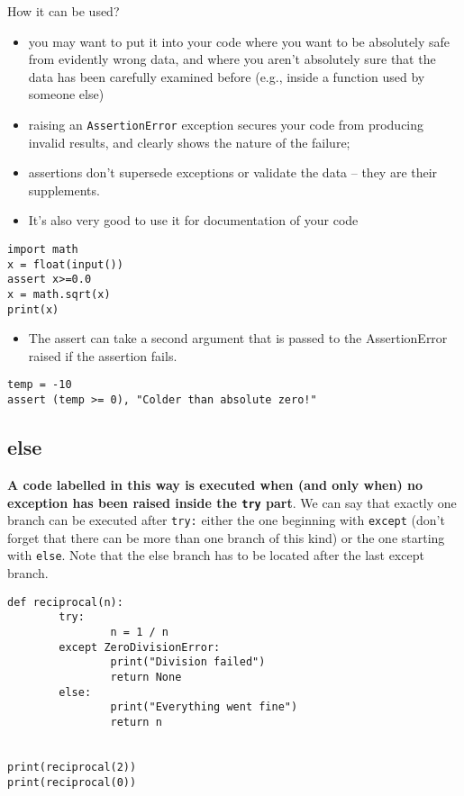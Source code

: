 \documentclass[11pt]{article}
\begin{document}
How it can be used?
\begin{itemize}
\item you may want to put it into your code where you want to be
absolutely safe from evidently wrong data, and where you aren’t
absolutely sure that the data has been carefully examined before
(e.g., inside a function used by someone else)
\item raising an \texttt{AssertionError} exception secures your code from producing
invalid results, and clearly shows the nature of the failure;
\item assertions don’t supersede exceptions or validate the data – they
are their supplements.
\item It's also very good to use it for documentation of your code
\end{itemize}

\begin{verbatim}
import math
x = float(input())
assert x>=0.0
x = math.sqrt(x)
print(x)
\end{verbatim}

\begin{itemize}
\item The assert can take a second argument that is passed to the
AssertionError raised if the assertion fails.
\end{itemize}

\begin{verbatim}
temp = -10
assert (temp >= 0), "Colder than absolute zero!"
\end{verbatim}

\subsection{else}
\label{sec:org483336a}
\textbf{A code labelled in this way is executed when (and only when) no}
\textbf{exception has been raised inside the \texttt{try} part}.  We can say that
exactly one branch can be executed after \texttt{try:} either the one
beginning with \texttt{except} (don’t forget that there can be more than one
branch of this kind) or the one starting with \texttt{else}. Note that the
else branch has to be located after the last except branch.

\begin{verbatim}
def reciprocal(n):
        try:
                n = 1 / n
        except ZeroDivisionError:
                print("Division failed")
                return None
        else:
                print("Everything went fine")
                return n


print(reciprocal(2))
print(reciprocal(0))
\end{verbatim}
\end{document}
